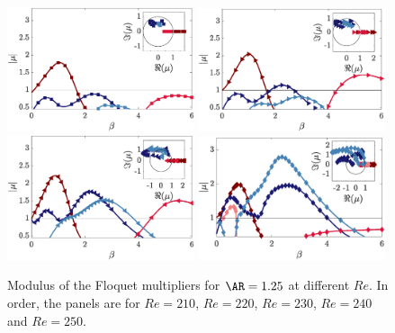 \begin{figure}
  \centering
  \includegraphics[width=0.49\textwidth]{./fig/AR1p25/mu_beta_Re210.eps}
  \includegraphics[width=0.49\textwidth]{./fig/AR1p25/mu_beta_Re220.eps}
  \includegraphics[width=0.49\textwidth]{./fig/AR1p25/mu_beta_Re230.eps}
  \includegraphics[width=0.49\textwidth]{./fig/AR1p25/mu_beta_Re240.eps}
  \caption{Modulus of the Floquet multipliers for $\AR=1.25$ at different $Re$. In order, the panels are for $Re=210$, $Re=220$, $Re=230$, $Re=240$ and $Re=250$.}
  \label{fig:mult-AR1p25}
\end{figure}
%
